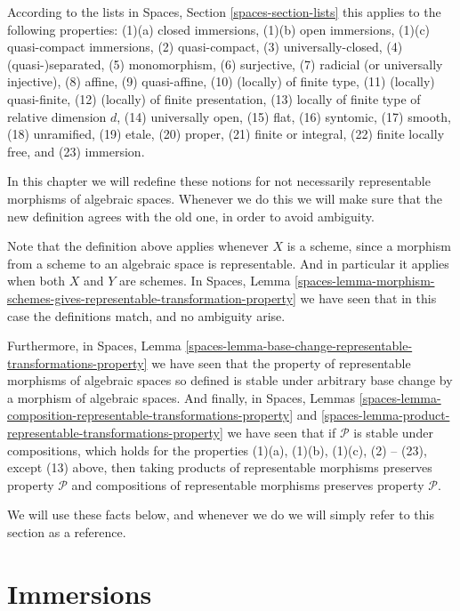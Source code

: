 \medskip\noindent
According to the lists in
Spaces, Section \ref{spaces-section-lists}
this applies to the following properties:
(1)(a) closed immersions,
(1)(b) open immersions,
(1)(c) quasi-compact immersions,
(2) quasi-compact,
(3) universally-closed,
(4) (quasi-)separated,
(5) monomorphism,
(6) surjective,
(7) radicial (or universally injective),
(8) affine,
(9) quasi-affine,
(10) (locally) of finite type,
(11) (locally) quasi-finite,
(12) (locally) of finite presentation,
(13) locally of finite type of relative dimension $d$,
(14) universally open,
(15) flat,
(16) syntomic,
(17) smooth,
(18) unramified,
(19) etale,
(20) proper,
(21) finite or integral,
(22) finite locally free, and
(23) immersion.

\medskip\noindent
In this chapter we will redefine these notions for not necessarily
representable morphisms of algebraic spaces. Whenever we do this we will make
sure that the new definition agrees with the old one, in order to avoid
ambiguity.

\medskip\noindent
Note that the definition above applies whenever $X$ is a scheme,
since a morphism from a scheme to an algebraic space is representable.
And in particular it applies when both $X$ and $Y$ are schemes.
In Spaces, Lemma
\ref{spaces-lemma-morphism-schemes-gives-representable-transformation-property}
we have seen that in this case the definitions
match, and no ambiguity arise.

\medskip\noindent
Furthermore, in Spaces,
Lemma \ref{spaces-lemma-base-change-representable-transformations-property}
we have seen that the property of
representable morphisms of algebraic spaces so defined is stable under
arbitrary base change by a morphism of algebraic spaces.
And finally, in Spaces, Lemmas
\ref{spaces-lemma-composition-representable-transformations-property}
and
\ref{spaces-lemma-product-representable-transformations-property}
we have seen that if $\mathcal{P}$ is stable under compositions,
which holds for the properties
(1)(a), (1)(b), (1)(c), (2) -- (23), except (13) above, then
taking products of representable morphisms preserves property $\mathcal{P}$ 
and compositions of representable morphisms preserves property $\mathcal{P}$.

\medskip\noindent
We will use these facts below, and whenever we do we will simply refer
to this section as a reference.





\section{Immersions}
\label{section-immersions}

